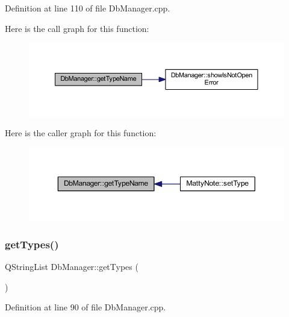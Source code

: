 Definition at line 110 of file Db\+Manager.\+cpp.

Here is the call graph for this function\+:
\nopagebreak
\begin{figure}[H]
\begin{center}
\leavevmode
\includegraphics[width=350pt]{classDbManager_a6cb58e12049873e8b1b4b6ecd74dbfb6_cgraph}
\end{center}
\end{figure}
Here is the caller graph for this function\+:
\nopagebreak
\begin{figure}[H]
\begin{center}
\leavevmode
\includegraphics[width=350pt]{classDbManager_a6cb58e12049873e8b1b4b6ecd74dbfb6_icgraph}
\end{center}
\end{figure}
\hypertarget{classDbManager_ade7585873652935bb12cb1ad546ceba2}{}\label{classDbManager_ade7585873652935bb12cb1ad546ceba2} 
\subsubsection{\texorpdfstring{get\+Types()}{getTypes()}}
{\footnotesize\ttfamily Q\+String\+List Db\+Manager\+::get\+Types (\begin{DoxyParamCaption}{ }\end{DoxyParamCaption})\hspace{0.3cm}{\ttfamily [static]}}



Definition at line 90 of file Db\+Manager.\+cpp.

